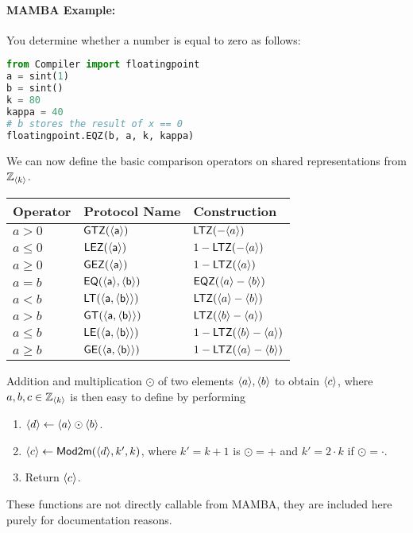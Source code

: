 \paragraph{MAMBA Example:} You determine whether a number is equal to zero as follows: 
\begin{lstlisting}[language={python}]
from Compiler import floatingpoint
a = sint(1)
b = sint()
k = 80
kappa = 40
# b stores the result of x == 0
floatingpoint.EQZ(b, a, k, kappa)
\end{lstlisting}


We can now define the basic comparison operators on shared
representations from ${\mathbb{Z}}_{\langle k \rangle}$.
\begin{center}
\begin{tabular}{|lll|}
\hline
Operator & Protocol Name & Construction \\
\hline
$a>0$    & $\mathsf{GTZ(\langle a \rangle)}$           & $\mathsf{LTZ}(-\langle a \rangle)$ \\
$a\le0$  & $\mathsf{LEZ(\langle a \rangle)}$           & $1-\mathsf{LTZ}(-\langle a \rangle)$ \\
$a\ge0$  & $\mathsf{GEZ(\langle a \rangle)}$           & $1-\mathsf{LTZ}(\langle a \rangle)$ \\
$a=b$    & $\mathsf{EQ(\langle a \rangle,\langle b \rangle)}$ & $\mathsf{EQZ}(\langle a \rangle-\langle b \rangle)$ \\
$a<b$    & $\mathsf{LT(\langle a,\langle b \rangle \rangle)}$ & $\mathsf{LTZ}(\langle a \rangle-\langle b \rangle)$ \\
$a>b$    & $\mathsf{GT(\langle a,\langle b \rangle \rangle)}$ & $\mathsf{LTZ}(\langle b \rangle-\langle a \rangle)$ \\
$a\le b$ & $\mathsf{LE(\langle a,\langle b \rangle \rangle)}$ & $1-\mathsf{LTZ}(\langle b \rangle-\langle a \rangle)$ \\
$a\ge b$ & $\mathsf{GE(\langle a,\langle b \rangle \rangle)}$ & $1-\mathsf{LTZ}(\langle a \rangle-\langle b \rangle)$ \\
\hline
\end{tabular}
\end{center}

Addition and multiplication $\odot$ of two elements $\langle a \rangle, \langle b \rangle$
to obtain $\langle c \rangle$, where $a,b,c \in {\mathbb{Z}}_{\langle k \rangle}$ is then easy to define 
by performing 
\begin{enumerate}
\item $\langle d \rangle \leftarrow \langle a \rangle \odot \langle b \rangle$.
\item $\langle c \rangle \leftarrow \mathsf{Mod2m}(\langle d \rangle,k',k)$,
	where $k'=k+1$ is $\odot=+$ and $k'=2\cdot k$ if $\odot=\cdot$.
\item Return $\langle c \rangle$.
\end{enumerate}
These functions are not directly callable from MAMBA, they are
included here purely for documentation reasons.

